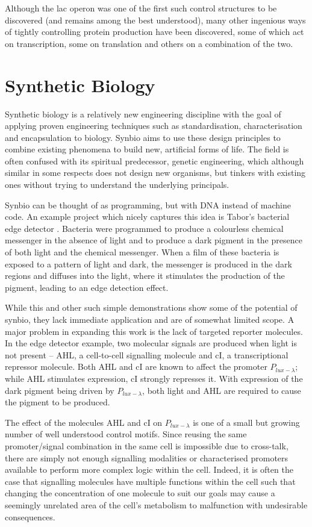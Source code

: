 Although the lac operon was one of the first such control structures to be
discovered (and remains among the best understood), many other ingenious ways
of tightly controlling protein production have been discovered, some of which
act on transcription, some on translation and others on a combination of the
two.

\section{Synthetic Biology}
\label{sec:synbio}

Synthetic biology is a relatively new
engineering discipline with the goal of applying proven engineering techniques
such as standardisation, characterisation and encapsulation to biology.
Synbio aims to use these design principles to combine existing phenomena to 
build new, artificial forms of life.
The field is often confused with its spiritual predecessor, genetic 
engineering, which although similar in some respects does not design new
organisms, but tinkers with existing ones without trying to understand the
underlying principals.

Synbio can be thought of as programming, but with DNA instead of machine
code.
An example project which nicely captures this idea is Tabor's bacterial edge
detector \citep{edgeDetector}.
Bacteria were programmed to produce a colourless chemical messenger in the 
absence of light and to produce a dark pigment in the presence of both light 
and the chemical messenger.
When a film of these bacteria is exposed to a pattern of light and dark, the
messenger is produced in the dark regions and diffuses into the light, where it
stimulates the production of the pigment, 
leading to an edge detection effect.

While this and other such simple demonstrations show some of the potential 
of synbio, they lack immediate application and are of somewhat limited scope.
A major problem in expanding this work is the lack of targeted reporter
molecules.
In the edge detector example, two molecular signals are produced when light is 
not present -- AHL, a cell-to-cell signalling molecule and cI, a
transcriptional repressor molecule.
Both AHL and cI are known to affect the promoter $P_{lux-\lambda}$; while AHL 
stimulates expression, cI strongly represses it.
With expression of the dark pigment being driven by $P_{lux-\lambda}$, 
both light and AHL are required to cause the pigment to be produced.

The effect of the molecules AHL and cI on $P_{lux-\lambda}$ is one of a small
but growing number of well understood control motifs.
Since reusing the same promoter/signal combination in the same cell is 
impossible due to cross-talk, there are simply not enough signalling modalities 
or characterised promoters available to perform more complex logic within the 
cell.
Indeed, it is often the case that signalling molecules have multiple functions
within the cell such that changing the concentration of one molecule to suit
our goals may cause a seemingly unrelated area of the cell's metabolism to
malfunction with undesirable consequences.

